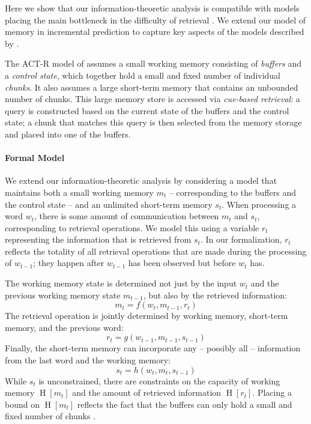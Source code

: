 \documentclass[11pt,letterpaper]{article}
\begin{document}
Here we show that our information-theoretic analysis is compatible with models placing the main bottleneck in the difficulty of retrieval \citep{mcelree2000sentence,lewis-activation-based-2005,nicenboim2018models,vasishth2019computational}.
We extend our model of memory in incremental prediction to capture key aspects of the models described by \citet{lewis-activation-based-2005,nicenboim2018models,vasishth2019computational}.

The ACT-R model of \cite{lewis-activation-based-2005} assumes a small working memory consisting of \emph{buffers} and a \emph{control state}, which together hold a small and fixed number of individual \emph{chunks}.
It also assumes a large short-term memory that contains an unbounded number of chunks.
This large memory store is accessed via \emph{cue-based retrieval}: a query is constructed based on the current state of the buffers and the control state; a chunk that matches this query is then selected from the memory storage and placed into one of the buffers.

\paragraph{Formal Model}
We extend our information-theoretic analysis by considering a model that maintains both a small working memory $m_t$ -- corresponding to the buffers and the control state -- and an unlimited short-term memory $s_t$.
When processing a word $w_t$, there is some amount of communication between $m_t$ and $s_t$, corresponding to retrieval operations.
We model this using a variable $r_t$ representing the information that is retrieved from $s_t$.
In our formalization, $r_t$ reflects the totality of all retrieval operations that are made during the processing of $w_{t-1}$; they happen after $w_{t-1}$ has been observed but before $w_t$ has.

The working memory state is determined not just by the input $w_t$ and the previous working memory state $m_{t-1}$, but also by the retrieved information:
\begin{equation}
	m_t = f(w_t, m_{t-1}, r_t) 
\end{equation}
The retrieval operation is jointly determined by working memory, short-term memory, and the previous word:
\begin{equation}\label{eq:rt}
	r_t = g(w_{t-1}, m_{t-1}, s_{t-1}) 
\end{equation}
Finally, the short-term memory can incorporate any -- possibly all -- information from the last word and the working memory:
\begin{equation}
	s_t = h(w_{t}, m_{t}, s_{t-1}) 
\end{equation}
While $s_t$ is unconstrained, there are constraints on the capacity of working memory $\operatorname{H}[m_t]$ and the amount of retrieved information $\operatorname{H}[r_t]$.
Placing a bound on $\operatorname{H}[m_t]$ reflects the fact that the buffers can only hold a small and fixed number of chunks \citep{lewis-activation-based-2005}.
\end{document}
